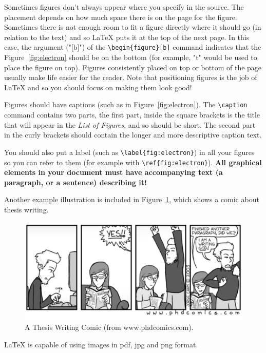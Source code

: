 Sometimes figures don't always appear where you specify in the source. The placement depends on how much space there is on the page for the figure. Sometimes there is not enough room to fit a figure directly where it should go (in relation to the text) and so \LaTeX{} puts it at the top of the next page. In this case, the argument ("[b]") of the \verb|\begin{figure}[b]| command indicates that the Figure~\ref{fig:electron} should be on the bottom (for example, "t" would be used to place the figure on top). Figures consistently placed on top or bottom of the page usually make life easier for the reader. Note that positioning figures is the job of \LaTeX{} and so you should focus on making them look good! 

Figures should have captions (such as in Figure~\ref{fig:electron}). The \verb|\caption| command contains two parts, the first part, inside the square brackets is the title that will appear in the \emph{List of Figures}, and so should be short. The second part in the curly brackets should contain the longer and more descriptive caption text. 

You should also put a label (such as \verb|\label{fig:electron}|) in all your figures so you can refer to them (for example with \verb|\ref{fig:electron}|). {\bf All graphical elements in your document must have accompanying text (a paragraph, or a sentence) describing it!}

Another example illustration is included in Figure~\ref{fig:comic}, which shows a comic about thesis writing.

\begin{figure}[t]
\centering
\includegraphics[width=\textwidth,keepaspectratio]{CH2/assets/comic}
\caption[Thesis Writing Comic]{A Thesis Writing Comic (from www.phdcomics.com).}
\label{fig:comic}
\end{figure}

\LaTeX{} is capable of using images in pdf, jpg and png format.

